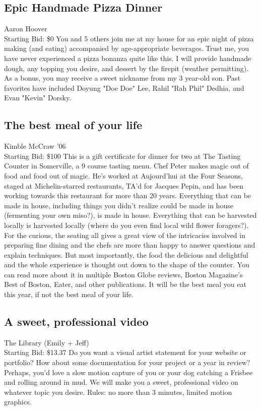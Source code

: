 \documentclass[11pt]{article}
\begin{document}
\subsection{Epic Handmade Pizza Dinner}
Aaron Hoover
\\
Starting Bid: \$0
\newline
You and 5 others join me at my house for an epic night of pizza making (and eating) accompanied by age-appropriate beverages. Trust me, you have never experienced a pizza bonanza quite like this. I will provide handmade dough, any topping you desire, and dessert by the firepit (weather permitting).  As a bonus, you may receive a sweet nickname from my 3 year-old son. Past favorites have included Doyung "Doe Doe" Lee, Rahil "Rah Phil" Dedhia, and Evan "Kevin" Dorsky.
\subsection{The best meal of your life}
Kimble McCraw '06
\\
Starting Bid: \$100
\newline
This is a gift certificate for dinner for two at The Tasting Counter in Somerville, a 9 course tasting menu. Chef Peter makes magic out of food and food out of magic. He's worked at Aujourd’hui at the Four Seasons, staged at Michelin-starred restaurants, TA'd for Jacques Pepin, and has been working towards this restaurant for more than 20 years. Everything that can be made in house, including things you didn't realize could be made in house (fermenting your own miso?), is made in house. Everything that can be harvested locally is harvested locally (where do you even find local wild flower foragers?). For the curious, the seating all gives a great view of the intricacies involved in preparing fine dining and the  chefs are more than happy to answer questions and explain techniques. But most importantly, the food the delicious and delightful and the whole experience is thought out down to the shape of the counter. You can read more about it in multiple Boston Globe reviews, Boston Magazine's Best of Boston, Eater, and other publications. It will be the best meal you eat this year, if not the best meal of your life.
\subsection{A sweet, professional video}
The Library (Emily + Jeff)
\\
Starting Bid: \$13.37
\newline
Do you want a visual artist statement for your website or portfolio? How about some documentation for your project or a year in review? Perhaps, you'd love a slow motion capture of you or your dog catching a Frisbee and rolling around in mud. We will make you a sweet, professional video on whatever topic you desire. Rules: no more than 3 minutes, limited motion graphics.
\end{document}
